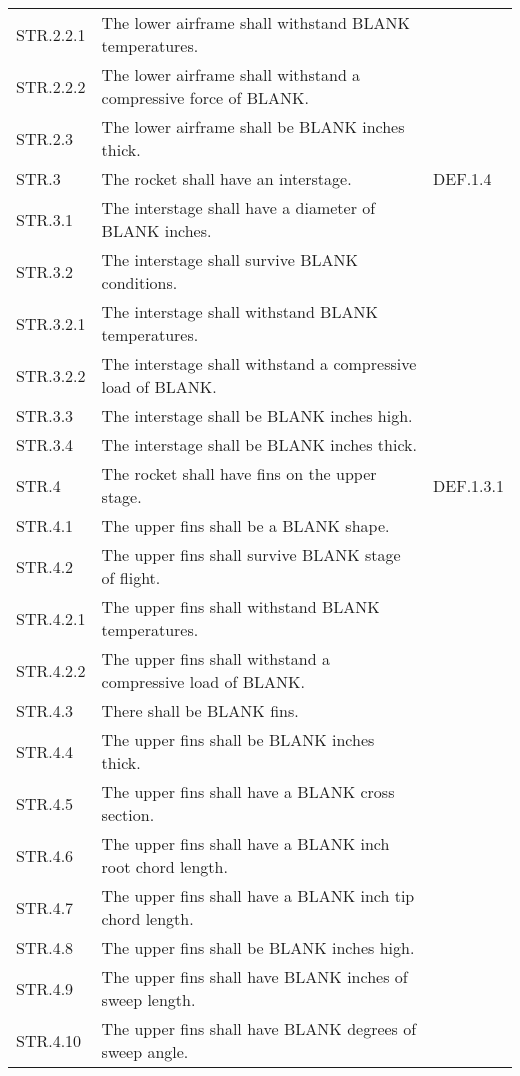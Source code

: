 \begin{table}[htbp]
\begin{tabulary}{\textwidth}{@{}LLL@{}}
        STR.2.2.1 & The lower airframe shall withstand BLANK temperatures. &  \\
        STR.2.2.2 & The lower airframe shall withstand a compressive force of BLANK. &  \\
        STR.2.3 & The lower airframe shall be BLANK inches thick. &  \\
    \midrule
        STR.3 & The rocket shall have an interstage. & DEF.1.4 \\
        STR.3.1 & The interstage shall have a diameter of BLANK inches. &  \\
        STR.3.2 & The interstage shall survive BLANK conditions. &  \\
        STR.3.2.1 & The interstage shall withstand BLANK temperatures. &  \\
        STR.3.2.2 & The interstage shall withstand a compressive load of BLANK. &  \\
        STR.3.3 & The interstage shall be BLANK inches high. &  \\
        STR.3.4 & The interstage shall be BLANK inches thick.  &  \\
    \midrule
        STR.4 & The rocket shall have fins on the upper stage. & DEF.1.3.1 \\
        STR.4.1 & The upper fins shall be a BLANK shape. &  \\
        STR.4.2 & The upper fins shall survive BLANK stage of flight. &  \\
        STR.4.2.1 & The upper fins shall withstand BLANK temperatures. &  \\
        STR.4.2.2 & The upper fins shall withstand a compressive load of BLANK. &  \\
        STR.4.3 & There shall be BLANK fins. &  \\
        STR.4.4 & The upper fins shall be BLANK inches thick. &  \\
        STR.4.5 & The upper fins shall have a BLANK cross section. &  \\
        STR.4.6 & The upper fins shall have a BLANK inch root chord length. &  \\
        STR.4.7 & The upper fins shall have a BLANK inch tip chord length. &  \\
        STR.4.8 & The upper fins shall be BLANK inches high. &  \\
        STR.4.9 & The upper fins shall have BLANK inches of sweep length. &  \\
        STR.4.10 & The upper fins shall have BLANK degrees of sweep angle. &  \\

\end{tabulary}
\end{table}
